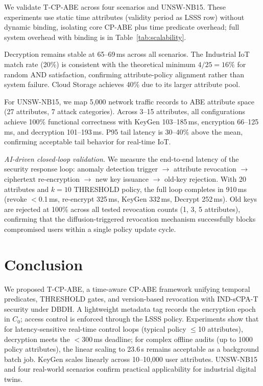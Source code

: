 ﻿\documentclass[lettersize,journal]{IEEEtran}
\begin{document}
We validate T-CP-ABE across four scenarios and UNSW-NB15.
These experiments use static
time attributes (validity period as LSSS row) without dynamic binding,
isolating core CP-ABE plus time predicate overhead; full system overhead
with binding is in Table~\ref{tab:scalability}.

Decryption remains stable at 65--69\,ms across all scenarios. The
Industrial IoT match rate (20\%) is consistent with the theoretical
minimum $4/25 = 16\%$ for random AND satisfaction, confirming
attribute-policy alignment rather than system failure. Cloud Storage
achieves 40\% due to its larger attribute pool.

For UNSW-NB15, we map 5,000 network traffic records to ABE attribute space
(27 attributes, 7 attack categories). Across 3--15 attributes, all configurations
achieve 100\% functional correctness with KeyGen 103--185\,ms, encryption
66--125\,ms, and decryption 101--193\,ms. P95 tail latency is 30--40\% above
the mean, confirming acceptable tail behavior for real-time IoT.

\textit{AI-driven closed-loop validation.}
We measure the end-to-end latency of the security response loop:
anomaly detection trigger $\rightarrow$ attribute revocation
$\rightarrow$ ciphertext re-encryption $\rightarrow$ new key issuance
$\rightarrow$ old-key rejection. With 20 attributes and $k{=}10$
THRESHOLD policy, the full loop completes in 910\,ms (revoke
$<$0.1\,ms, re-encrypt 325\,ms, KeyGen 332\,ms, Decrypt 252\,ms).
Old keys are rejected at 100\% across all tested revocation counts
(1, 3, 5 attributes), confirming that the diffusion-triggered
revocation mechanism successfully blocks compromised users within
a single policy update cycle.

\section{Conclusion}
\label{sec:conclusion}

We proposed T-CP-ABE, a time-aware CP-ABE framework unifying temporal
predicates, THRESHOLD gates, and version-based revocation with IND-sCPA-T
security under DBDH.  A lightweight metadata tag records the encryption
epoch in $C_0$; access control is enforced through the LSSS policy.
Experiments show that for latency-sensitive real-time control loops
(typical policy $\leq$10 attributes), decryption meets the $<$300\,ms
deadline; for complex offline audits (up to 1000 policy attributes), the
linear scaling to 23.6\,s remains acceptable as a background batch job.
KeyGen scales linearly across 10--10,000 user attributes.
UNSW-NB15 and four real-world scenarios confirm
practical applicability for industrial digital twins.
\end{document}
